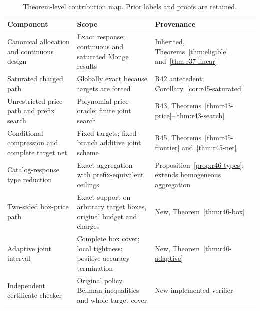 \begin{table}[p]\centering
\caption{Theorem-level contribution map. Prior labels and proofs are retained.}\label{tab:r46-contributions}
\begin{tabular}{p{}p{}p{}}\toprule
Component & Scope & Provenance \\\midrule
Canonical allocation and continuous design & Exact response; continuous and saturated Monge results & Inherited, Theorems~\ref{thm:eligible} and~\ref{thm:r37-linear} \\
Saturated charged path & Globally exact because targets are forced & R42 antecedent; Corollary~\ref{cor:r45-saturated} \\
Unrestricted price path and prefix search & Polynomial price oracle; finite joint search & R43, Theorems~\ref{thm:r43-price}--\ref{thm:r43-search} \\
Conditional compression and complete target net & Fixed targets; fixed-branch additive joint scheme & R45, Theorems~\ref{thm:r45-frontier} and~\ref{thm:r45-net} \\
Catalog-response type reduction & Exact aggregation with prefix-equivalent ceilings & Proposition~\ref{prop:r46-types}; extends homogeneous aggregation \\
Two-sided box-price path & Exact support on arbitrary target boxes, original budget and charges & New, Theorem~\ref{thm:r46-box} \\
Adaptive joint interval & Complete box cover; local tightness; positive-accuracy termination & New, Theorem~\ref{thm:r46-adaptive} \\
Independent certificate checker & Original policy, Bellman inequalities and whole target cover & New implemented verifier \\
\bottomrule\end{tabular}\end{table}
